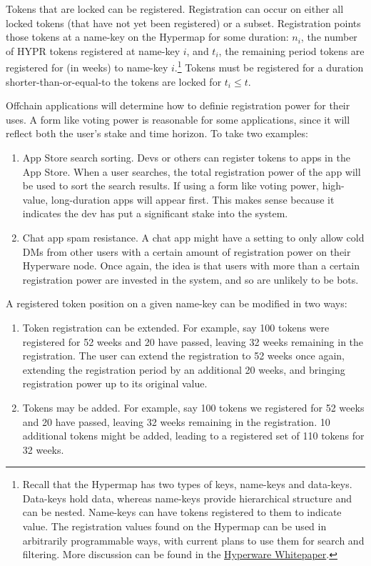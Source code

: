 \documentclass{article}
\begin{document}
Tokens that are locked can be registered.
Registration can occur on either all locked tokens (that have not yet been registered) or a subset.
Registration points those tokens at a name-key on the Hypermap for some duration: $n_i$, the number of HYPR tokens registered at name-key $i$, and $t_i$, the remaining period tokens are registered for (in weeks) to name-key $i$.\footnote{
	Recall that the Hypermap has two types of keys, name-keys and data-keys.
	Data-keys hold data, whereas name-keys provide hierarchical structure and can be nested.
	Name-keys can have tokens registered to them to indicate value.
	The registration values found on the Hypermap can be used in arbitrarily programmable ways, with current plans to use them for search and filtering.
	More discussion can be found in the \href{https://hyperware.ai/whitepaper.pdf}{Hyperware Whitepaper}.
}
Tokens must be registered for a duration shorter-than-or-equal-to the tokens are locked for $t_i \leq t$.

Offchain applications will determine how to definie registration power for their uses.
A form like voting power is reasonable for some applications, since it will reflect both the user's stake and time horizon.
To take two examples:
\begin{enumerate}
	\item App Store search sorting.
		Devs or others can register tokens to apps in the App Store.
		When a user searches, the total registration power of the app will be used to sort the search results.
		If using a form like voting power, high-value, long-duration apps will appear first.
		This makes sense because it indicates the dev has put a significant stake into the system.
	\item Chat app spam resistance.
		A chat app might have a setting to only allow cold DMs from other users with a certain amount of registration power on their Hyperware node.
		Once again, the idea is that users with more than a certain registration power are invested in the system, and so are unlikely to be bots.
\end{enumerate}

A registered token position on a given name-key can be modified in two ways:
\begin{enumerate}
    \item Token registration can be extended.
       For example, say 100 tokens were registered for 52 weeks and 20 have passed, leaving 32 weeks remaining in the registration.
       The user can extend the registration to 52 weeks once again, extending the registration period by an additional 20 weeks, and bringing registration power up to its original value.
    \item Tokens may be added.
       For example, say 100 tokens we registered for 52 weeks and 20 have passed, leaving 32 weeks remaining in the registration.
       10 additional tokens might be added, leading to a registered set of 110 tokens for 32 weeks.
\end{enumerate}
\end{document}

